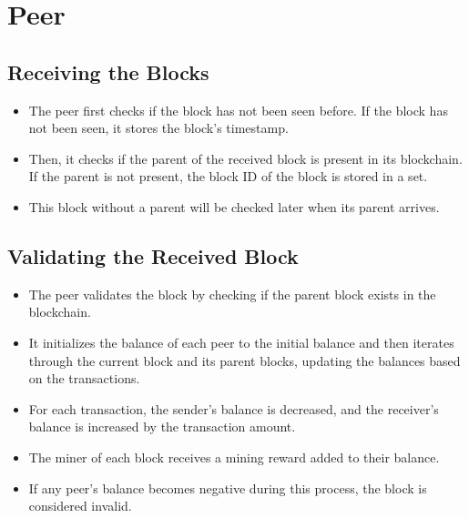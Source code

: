\documentclass[a4paper,12pt]{article}
\begin{document}

\section*{Peer}

\subsection*{Receiving the Blocks}
\begin{itemize}
	\item The peer first checks if the block has not been seen before. If the block has not been seen, it stores the block's timestamp.
	\item Then, it checks if the parent of the received block is present in its blockchain. If the parent is not present, the block ID of the block is stored in a set.
	\item This block without a parent will be checked later when its parent arrives.
\end{itemize}

\subsection*{Validating the Received Block}

\begin{itemize}
    \item The peer validates the block by checking if the parent block exists in the blockchain.
    \item It initializes the balance of each peer to the initial balance and then iterates through the current block and its parent blocks, updating the balances based on the transactions.
    \item For each transaction, the sender's balance is decreased, and the receiver's balance is increased by the transaction amount.
    \item The miner of each block receives a mining reward added to their balance.
    \item If any peer's balance becomes negative during this process, the block is considered invalid.
\end{itemize}
\end{document}
